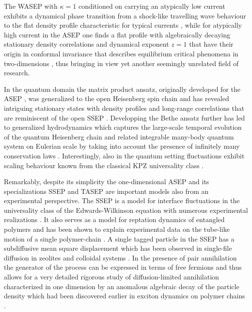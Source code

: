 \documentclass[12pt]{article}
\begin{document}
The WASEP with $\kappa=1$ conditioned on carrying an atypically low 
current exhibits a dynamical phase transition from a shock-like 
travelling wave behaviour to the flat density profile characteristic for 
typical currents \cite{Bodi05,Beli13}, while for atypically high current 
in the ASEP one finds a flat profile with algebraically decaying 
stationary density correlations and dynamical exponent $z=1$ 
\cite{Spoh99,Popk11,Jack15a} that have their origin in conformal 
invariance \cite{Kare17} that describes equilibrium critical 
phenomena in two-dimensions \cite{Card10}, thus bringing in view 
yet another seemingly unrelated field of research. 

In the quantum domain the matrix product ansatz, originally developed
for the ASEP \cite{Derr93a}, was generalized to the open Heisenberg 
spin chain \cite{Pros11,Pros15} and has revealed intriguing stationary 
states with density profiles \cite{Pros11,Kare13b} and long-range 
correlations \cite{Pros11,Buca16} that are reminiscent of the open 
SSEP 
\cite{Spoh83,Derr02,Derr07,Bert15}. Developping the Bethe ansatz 
further has led to generalized hydrodynamics \cite{Cast16,Bert16} 
which captures the large-scale temporal evolution of the quantum 
Heisenberg chain and related integrable many-body quantum system on 
Eulerian scale by taking into account the presence of infinitely many 
conservation laws \cite{Doyo20,Essl22}. Interestingly, also in the 
quantum setting fluctuations exhibit scaling behaviour known 
from the classical KPZ universality class \cite{Ljub19,DeNa19,Ye22}.

Remarkably, despite its simplicity the one-dimensional ASEP and its 
specializations SSEP and TASEP are important models also from an 
experimental perspective. The SSEP is a model for interface 
fluctuations in the universality class of the Edwards-Wilkinson equation 
with numerous experimental realizations \cite{Edwa82,Krug97}. It also 
serves as a model for reptation dynamics of entangled polymers 
\cite{Doi85} and has been shown \cite{Schu99} to explain 
experimental data on the tube-like motion of a single polymer-chain 
\cite{Perk94}. A single tagged particle in the SSEP has a subdiffusive 
mean square displacement \cite{Arra83,vanB83} which has been 
observed in single-file diffusion in zeolites \cite{Kukl96} and colloidal 
systems \cite{Wei00}. In the presence of pair annihilation the 
generator of the process can be expressed in terms of free fermions 
\cite{Lush87,Gryn95,Schu95,benA98} and thus allows for a very 
detailed rigorous study of diffusion-limited annihilation characterized in 
one dimension by an anomalous algebraic decay of the particle density 
which had been discovered earlier in exciton dynamics on polymer 
chains \cite{Shan82,Vard82,Priv97}.
\end{document}
